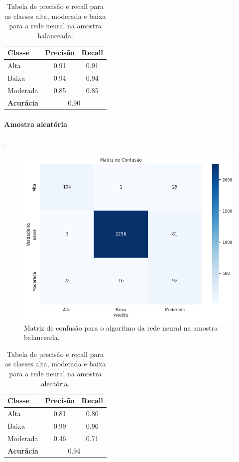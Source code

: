 \begin{table}[H]
    \centering
    \begin{tabular}{lcc}
        \toprule
        \textbf{Classe} & \textbf{Precisão} & \textbf{Recall} \\
        \midrule
        Alta      & 0.91 & 0.91 \\
        Baixa     & 0.94 & 0.94 \\
        Moderada  & 0.85 & 0.85 \\
        \midrule
        \textbf{Acurácia} & \multicolumn{2}{c}{0.90} \\
        \bottomrule
    \end{tabular}
    \caption{Tabela de precisão e recall para as classes alta, moderada e baixa para a rede neural na amostra balanceada.}
\end{table}

\paragraph{Amostra aleatória}.

\begin{figure}[H]
    \centering
    \includegraphics[scale = 0.4]{Graphics/Mat-Conf-Rede-Ale.png}
    \caption{Matriz de confusão para o algoritmo da rede neural na amostra balanceada.}
    \label{fig:enter-label}
\end{figure}

\begin{table}[H]
    \centering
    \begin{tabular}{lcc}
        \toprule
        \textbf{Classe} & \textbf{Precisão} & \textbf{Recall} \\
        \midrule
        Alta      & 0.81 & 0.80 \\
        Baixa     & 0.99 & 0.96 \\
        Moderada  & 0.46 & 0.71 \\
        \midrule
        \textbf{Acurácia} & \multicolumn{2}{c}{0.94} \\
        \bottomrule
    \end{tabular}
    \caption{Tabela de precisão e recall para as classes alta, moderada e baixa para a rede neural na amostra aleatória.}
\end{table}

